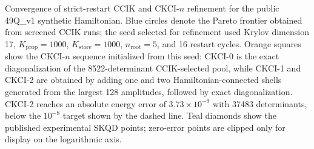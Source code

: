 Convergence of strict-restart CCIK and CKCI-$n$ refinement for the public 49Q\_v1 synthetic Hamiltonian. Blue circles denote the Pareto frontier obtained from screened CCIK runs; the seed selected for refinement used Krylov dimension 17, $K_{\mathrm{prop}}=1000$, $K_{\mathrm{store}}=1000$, $n_{\mathrm{root}}=5$, and 16 restart cycles. Orange squares show the CKCI-$n$ sequence initialized from this seed: CKCI-0 is the exact diagonalization of the 8522-determinant CCIK-selected pool, while CKCI-1 and CKCI-2 are obtained by adding one and two Hamiltonian-connected shells generated from the largest 128 amplitudes, followed by exact diagonalization. CKCI-2 reaches an absolute energy error of $3.73 \times 10^{-9}$ with 37483 determinants, below the $10^{-8}$ target shown by the dashed line. Teal diamonds show the published experimental SKQD points; zero-error points are clipped only for display on the logarithmic axis.
